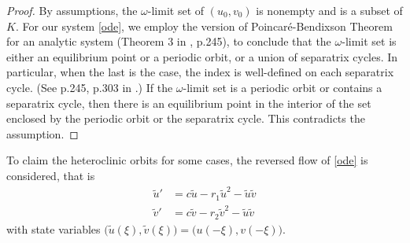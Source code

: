\documentclass{amsart}
\theoremstyle{definition}
\numberwithin{equation}{section}
\def\ii{{\textrm{int}}\,}
\begin{document}
\begin{proof}
By assumptions, the $\omega$-limit set of $(u_0,v_0)$ is nonempty and is a subset of $K$. For our system \eqref{ode}, we employ the version of Poincar\'e-Bendixson Theorem for an analytic system (Theorem 3 in \cite{perko_differential_2001}, p.245), to conclude that the $\omega$-limit set is either an equilibrium point or a periodic orbit, or a union of separatrix cycles. In particular, when the last is the case, the index is well-defined on each separatrix cycle. (See p.245, p.303 in \cite{perko_differential_2001}.) If the $\omega$-limit set is a periodic orbit or contains a separatrix cycle, then there is an equilibrium point in the interior of the set enclosed by the periodic orbit or the separatrix cycle. %
This contradicts the assumption. 
% 
% 
% 
% 
\end{proof}

To claim the heteroclinic orbits for some cases, the reversed flow of \eqref{ode} is considered, that is
\begin{equation}\label{barode}
\begin{aligned}
 \tilde{u}' &=c\tilde{u} - r_{1}\tilde{u}^{2} - \tilde {u} \tilde{v}\\
 \tilde{v}' &=c\tilde{v} - r_{2}\tilde{v}^{2} - \tilde{u} \tilde{v}
\end{aligned}
\end{equation} 
with state variables $\big(\tilde u(\xi), \tilde v(\xi)\big) = \big(u(-\xi),v(-\xi)\big)$. 
\end{document}
